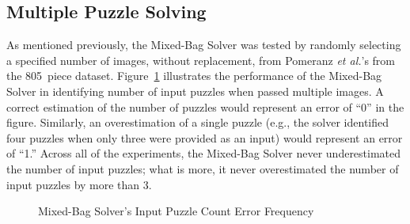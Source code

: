 \subsection{Multiple Puzzle Solving}

As mentioned previously, the Mixed-Bag Solver was tested by randomly selecting a specified number of images, without replacement, from Pomeranz \textit{et al.}'s  from the 805~piece dataset.  Figure~\ref{fig:inputPuzzleCountErrorFrequency} illustrates the performance of the Mixed-Bag Solver in identifying number of input puzzles when passed multiple images.  A correct estimation of the number of puzzles would represent an error of ``0'' in the figure.  Similarly, an overestimation of a single puzzle (e.g., the solver identified four puzzles when only three were provided as an input) would represent an error of ``1.''  Across all of the experiments, the Mixed-Bag Solver never underestimated the number of input puzzles; what is more, it never overestimated the number of input puzzles by more than 3.  

\begin{figure}
\begin{center}
\end{center}
\caption{Mixed-Bag Solver's Input Puzzle Count Error Frequency}
\label{fig:inputPuzzleCountErrorFrequency}
\end{figure}

